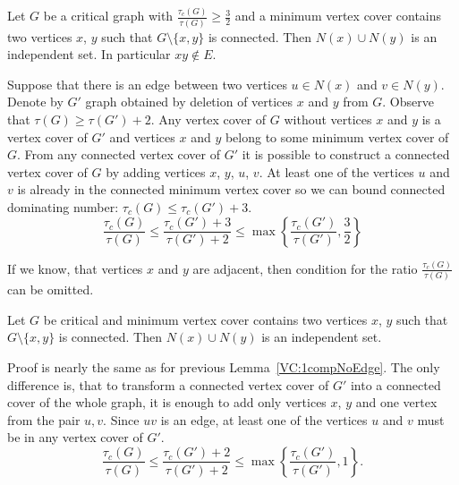 \begin{lemma}\label{VC:1compNoEdge}
	Let \(G\) be a critical graph with \(\frac{\tau_c(G)}{\tau(G)} \geq \frac{3}{2}\) and 
	a minimum vertex cover contains two vertices \(x\), \(y\) such that \(G \setminus \{x, y\}\) is connected.
	Then \(N(x) \cup N(y)\) is an independent set. In particular \(xy \not\in E\).
\end{lemma}

\begin{myproof}
	Suppose that there is an edge between two vertices \(u \in N(x)\) and \(v \in N(y)\).
	Denote by \(G'\) graph obtained by deletion of vertices \(x\) and \(y\) from \(G\).
	Observe that \(\tau(G) \geq {\tau(G') + 2}\). 
	Any vertex cover of \(G\) without vertices \(x\) and \(y\) is a vertex cover of \(G'\) and vertices \(x\) and \(y\) belong to some minimum vertex cover of \(G\).
	From any connected vertex cover of \(G'\) it is possible to construct a connected vertex cover of \(G\) by adding vertices \(x\), \(y\), \(u\), \(v\).
	At least one of the vertices \(u\) and \(v\) is already in the connected minimum vertex cover so we can bound connected dominating number: \(\tau_c(G) \leq \tau_c(G') + 3\).
	\[\frac{\tau_c(G)}{\tau(G)} \leq {\frac{\tau_c(G') + 3}{\tau(G') + 2}}  \leq {\max\left\{ \frac{\tau_c(G')}{\tau(G')}, \frac{3}{2}\right\}}\]
\end{myproof}

If we know, that vertices \(x\) and \(y\) are adjacent, then condition for the ratio \(\frac{\tau_c(G)}{\tau(G)}\) can be omitted.

\begin{lemma}\label{VC:1compEdge}
        Let \(G\) be critical and minimum vertex cover contains two vertices \(x\), \(y\) such that \(G \setminus \{x, y\}\) is connected.
        Then \(N(x) \cup N(y)\) is an independent set.
\end{lemma}

\begin{myproof}
	Proof is nearly the same as for previous Lemma~\ref{VC:1compNoEdge}.
	The only difference is, that to transform a connected vertex cover of \(G'\) into a connected cover of the whole graph, it is enough to add only vertices \(x\), \(y\)
	and one vertex from the pair \(u, v\). 
	Since \(uv\) is an edge, at least one of the vertices \(u\) and \(v\) must be in any vertex cover of \(G'\).
	\[\frac{\tau_c(G)}{\tau(G)} \leq {\frac{\tau_c(G') + 2}{\tau(G') + 2}}  \leq {\max\left\{ \frac{\tau_c(G')}{\tau(G')}, 1\right\}}.\]
\end{myproof}

